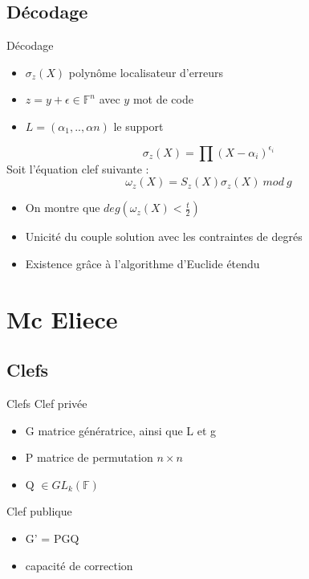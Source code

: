 \documentclass{beamer}
\begin{document}
		\subsection{Décodage}

			\begin{frame}{Décodage}
				\begin{itemize}
					\item $\sigma_{z}(X)$ polynôme localisateur d'erreurs
					\item $z = y + \epsilon \in \mathbb{F}^{n} $ avec $y$ mot de code
					\item $L = (\alpha_{1}, .. ,\alpha{n})$ le support
				\end{itemize}
				$$
					\sigma_{z}(X) = \prod (X-\alpha_{i})^{\epsilon_{i}}
				$$
				Soit l'équation clef suivante :
				$$
					\omega_{z}(X) = S_{z}(X) \sigma_{z}(X) \ mod \ g
				$$
				\begin{itemize}
					\item On montre que $deg(\omega_{z}(X) < \frac{t}{2}) $
					\item Unicité du couple solution avec les contraintes de degrés
					\item Existence grâce à l'algorithme d'Euclide étendu
				\end{itemize}

			\end{frame}

	\section{Mc Eliece}

		
		\subsection{Clefs}

			\begin{frame}{Clefs}
				Clef privée
				\begin{itemize}
					\item G matrice génératrice, ainsi que L et g
					\item P matrice de permutation $ n \times n$
					\item Q $\in GL_{k}(\mathbb{F})$
				\end{itemize}

				Clef publique
				\begin{itemize}
					\item G' = PGQ
					\item capacité de correction
				\end{itemize}
			
			\end{frame}
\end{document}
